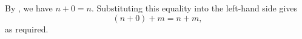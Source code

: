 By , we have $n+0=n$. Substituting this equality into the left-hand side gives
\[
(n+0)+m=n+m,
\]
as required.
